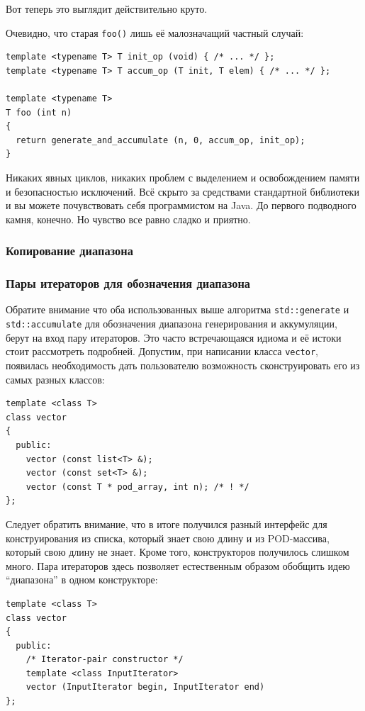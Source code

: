 \documentclass[a4paper,12pt,oneside]{article}
\begin{document}
Вот теперь это выглядит действительно круто.

Очевидно, что старая \lstinline!foo()! лишь её малозначащий частный случай:

\begin{lstlisting}
template <typename T> T init_op (void) { /* ... */ };
template <typename T> T accum_op (T init, T elem) { /* ... */ };

template <typename T> 
T foo (int n)
{
  return generate_and_accumulate (n, 0, accum_op, init_op);
}
\end{lstlisting}

Никаких явных циклов, никаких проблем с выделением и освобождением памяти и безопасностью исключений. Всё скрыто за средствами стандартной библиотеки и вы можете почувствовать себя программистом на Java. До первого подводного камня, конечно. Но чувство все равно сладко и приятно.

\subsubsection{Копирование диапазона}

\subsubsection{Пары итераторов для обозначения диапазона}

Обратите внимание что оба использованных выше алгоритма \lstinline!std::generate! и \lstinline!std::accumulate! для обозначения диапазона генерирования и аккумуляции, берут на вход пару итераторов. Это часто встречающаяся идиома и её истоки стоит рассмотреть подробней. Допустим, при написании класса \lstinline!vector!, появилась необходимость дать пользователю возможность сконструировать его из самых разных классов:

\begin{lstlisting}
template <class T>
class vector
{
  public:
    vector (const list<T> &); 
    vector (const set<T> &); 
    vector (const T * pod_array, int n); /* ! */
};
\end{lstlisting}

Следует обратить внимание, что в итоге получился разный интерфейс для конструирования из списка, который знает свою длину и из POD-массива, который свою длину не знает. Кроме того, конструкторов получилось слишком много. Пара итераторов здесь позволяет естественным образом обобщить идею ``диапазона'' в одном конструкторе:

\begin{lstlisting}
template <class T>
class vector
{
  public:
    /* Iterator-pair constructor */
    template <class InputIterator>
    vector (InputIterator begin, InputIterator end) 
};
\end{lstlisting}
\end{document}
